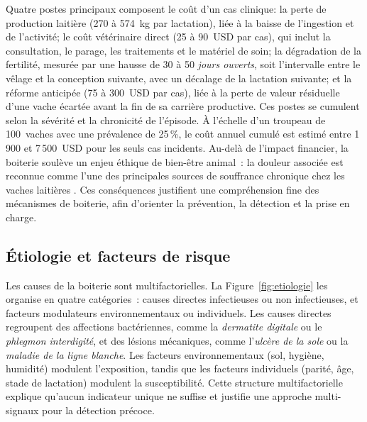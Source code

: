 Quatre postes principaux composent le coût d'un cas clinique: la perte de production
laitière (270 à 574~kg par lactation), liée à la baisse de l'ingestion et de l'activité;
le coût vétérinaire direct (25 à 90~USD par cas), qui inclut la consultation, le parage,
les traitements et le matériel de soin; la dégradation de la fertilité, mesurée par une
hausse de 30 à 50 \textit{jours ouverts}, soit l'intervalle entre le vêlage et la
conception suivante, avec un décalage de la lactation suivante; et la réforme anticipée
(75 à 300~USD par cas), liée à la perte de valeur résiduelle d'une vache écartée avant la
fin de sa carrière productive. Ces postes se cumulent selon la sévérité et la chronicité
de l'épisode. À l'échelle d'un troupeau de 100~vaches avec une prévalence de 25\,\%, le
coût annuel cumulé est estimé entre 1\,900 et 7\,500~USD pour les seuls cas incidents.
Au-delà de l'impact financier, la boiterie soulève un enjeu éthique de bien-être animal~:
la douleur associée est reconnue comme l'une des principales sources de souffrance
chronique chez les vaches laitières \citep{whay2003assessment}. Ces conséquences
justifient une compréhension fine des mécanismes de boiterie, afin d'orienter la
prévention, la détection et la prise en charge.

\subsection{Étiologie et facteurs de risque}
Les causes de la boiterie sont multifactorielles. La Figure~\ref{fig:etiologie} les
organise en quatre catégories~: causes directes infectieuses ou non infectieuses, et
facteurs modulateurs environnementaux ou individuels. Les causes directes regroupent des
affections bactériennes, comme la \textit{dermatite digitale} ou le \textit{phlegmon
interdigité}, et des lésions mécaniques, comme l'\textit{ulcère de la sole} ou la
\textit{maladie de la ligne blanche}. Les facteurs environnementaux (sol, hygiène,
humidité) modulent l'exposition, tandis que les facteurs individuels (parité, âge, stade
de lactation) modulent la susceptibilité. Cette structure multifactorielle explique
qu'aucun indicateur unique ne suffise et justifie une approche multi-signaux pour la
détection précoce.

